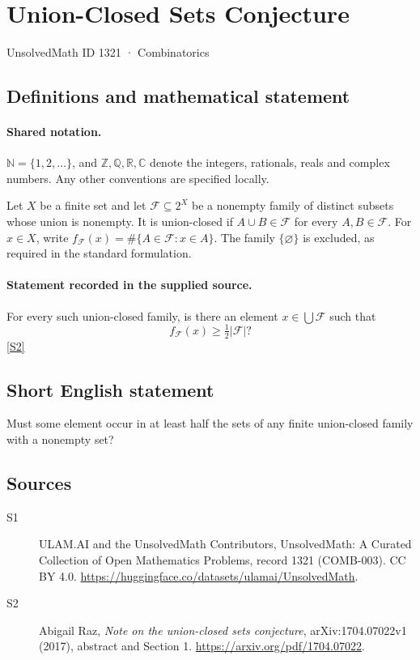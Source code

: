 \documentclass[11pt]{article}
\newcommand{\sref}[2]{\hyperlink{source:#1:#2}{[S#2]}}
\begin{document}
\setcounter{section}{1320}
\section{Union-Closed Sets Conjecture}\label{1321}
{\small\sffamily UnsolvedMath ID 1321 · Combinatorics}
\subsection{Definitions and mathematical statement}

\paragraph{Shared notation.}$\mathbb N=\{1,2,\ldots\}$, and $\mathbb Z,\mathbb Q,\mathbb R,\mathbb C$ denote the integers, rationals, reals and complex numbers. Any other conventions are specified locally.


Let $X$ be a finite set and let $\mathcal F\subseteq2^X$ be a nonempty family of distinct subsets whose union is nonempty. It is union-closed if $A\cup B\in\mathcal F$ for every $A,B\in\mathcal F$. For $x\in X$, write $f_{\mathcal F}(x)=\#\{A\in\mathcal F:x\in A\}$. The family $\{\varnothing\}$ is excluded, as required in the standard formulation.
\paragraph{Statement recorded in the supplied source.}
For every such union-closed family, is there an element $x\in\bigcup\mathcal F$ such that
\[
f_{\mathcal F}(x)\geq\tfrac12|\mathcal F|?
\] \sref{1321}{2}

\subsection{Short English statement}
Must some element occur in at least half the sets of any finite union-closed family with a nonempty set?
\subsection{Sources}
\begin{description}
\item[\hypertarget{source:1321:1}{S1}] ULAM.AI and the UnsolvedMath Contributors, UnsolvedMath: A Curated Collection of Open Mathematics Problems, record 1321 (COMB-003). CC BY 4.0. \url{https://huggingface.co/datasets/ulamai/UnsolvedMath}.
\item[\hypertarget{source:1321:2}{S2}] Abigail Raz, \emph{Note on the union-closed sets conjecture}, arXiv:1704.07022v1 (2017), abstract and Section 1. \url{https://arxiv.org/pdf/1704.07022}.
\end{description}
\label{end:1321}
\end{document}
